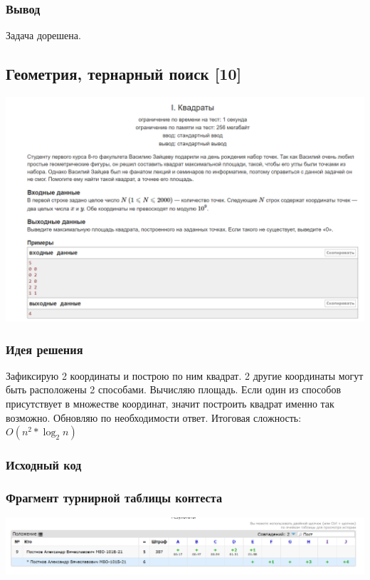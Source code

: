 \subsubsection*{Вывод}
Задача дорешена.

\vspace{20pt}

\pagebreak

\subsection*{Геометрия, тернарный поиск [10]}
\begin{center}
\includegraphics[width=\textwidth]{statements/10.png}
\end{center}
\subsubsection*{Идея решения}
Зафиксирую 2 координаты и построю по ним квадрат. 2 другие координаты могут быть расположены 2 способами. Вычисляю площадь. Если один из способов присутствует в множестве координат, значит построить квадрат именно так возможно. Обновляю по необходимости ответ. Итоговая сложность: $O(n^2*\log_{2} n)$
\subsubsection*{Исходный код}


\subsubsection*{Фрагмент турнирной таблицы контеста}
\begin{center}
\includegraphics[width=\textwidth]{standings/10.png}\newline\noindent
\end{center}

